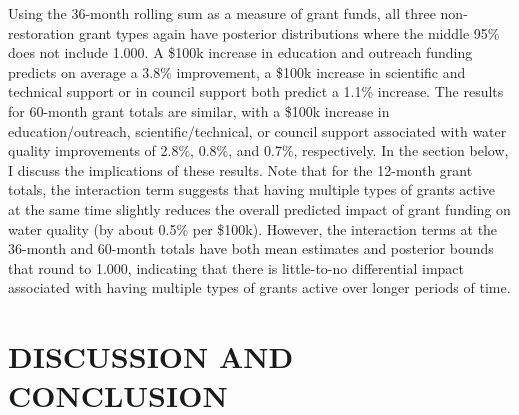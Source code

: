 \documentclass[12pt,a4paper,titlepage]{article}
\begin{document}
Using the 36-month rolling sum as a measure of grant funds, all three non-restoration grant types again have posterior distributions where the middle 95\% does not include 1.000. A \$100k increase in education and outreach funding predicts on average a 3.8\% improvement, a \$100k increase in scientific and technical support or in council support both predict a 1.1\% increase. The results for 60-month grant totals are similar, with a \$100k increase in education/outreach, scientific/technical, or council support associated with water quality improvements of 2.8\%, 0.8\%, and 0.7\%, respectively. In the section below, I discuss the implications of these results. Note that for the 12-month grant totals, the interaction term suggests that having multiple types of grants active at the same time slightly reduces the overall predicted impact of grant funding on water quality (by about 0.5\% per \$100k). However, the interaction terms at the 36-month and 60-month totals have both mean estimates and posterior bounds that round to 1.000, indicating that there is little-to-no differential impact associated with having multiple types of grants active over longer periods of time.



\section*{\bf\MakeUppercase{Discussion and Conclusion}}
\end{document}
